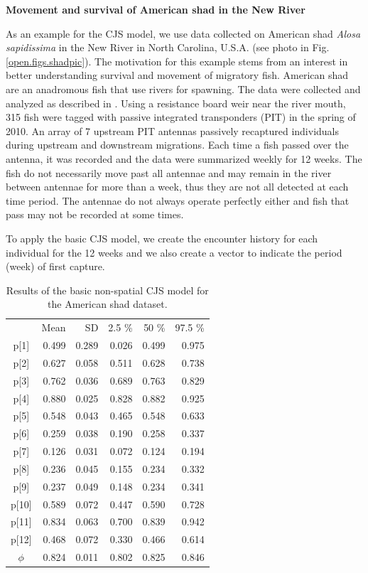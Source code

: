 {\flushleft \bf Movement and survival of American shad in the New River}

As an example for the CJS model, we use data collected on
American shad \textit{Alosa sapidissima} in the New River in North
Carolina, U.S.A. (see photo in Fig. \ref{open.figs.shadpic}). 
The motivation for this example stems
from an interest in better understanding survival and movement of
migratory fish.  American shad are an anadromous fish that use rivers for
spawning.
 The
data were collected and analyzed as described in \citet{raabe_diss:2012}.  Using a
resistance board weir near the river mouth, 315 fish were tagged with
passive integrated transponders (PIT) in the spring of 2010. An array
of 7 upstream PIT antennas passively recaptured individuals during
upstream and downstream migrations.  Each time a fish passed over the
antenna, it was recorded and the data were summarized weekly for 12 weeks. 
The fish
do not necessarily move past all antennae and may remain in the river
between antennae for more than a week, thus they are not all detected
at each time period.  The antennae do not always operate perfectly
either and fish that pass may not be recorded at some times.

To apply the basic CJS model, we create the
encounter history for each individual for the 12 weeks and we also create
a vector to indicate the period (week) of first capture.

\begin{table}
\centering
\caption{Results of the basic non-spatial CJS model for the American shad dataset.
}
\begin{tabular}{crrrrr}
\hline \hline
&    Mean   &  SD  &  2.5 \%   &   50 \%    &  97.5 \% \\
p[1] & 0.499 & 0.289 & 0.026 & 0.499 & 0.975 \\
p[2] & 0.627 & 0.058 & 0.511 & 0.628 & 0.738 \\
p[3] & 0.762 & 0.036 & 0.689 & 0.763 & 0.829 \\
p[4] & 0.880 & 0.025 & 0.828 & 0.882 & 0.925 \\
p[5] & 0.548 & 0.043 & 0.465 & 0.548 & 0.633 \\
p[6] & 0.259 & 0.038 & 0.190 & 0.258 & 0.337 \\
p[7] & 0.126 & 0.031 & 0.072 & 0.124 & 0.194 \\
p[8] & 0.236 & 0.045 & 0.155 & 0.234 & 0.332 \\
p[9] & 0.237 & 0.049 & 0.148 & 0.234 & 0.341 \\
p[10]& 0.589 & 0.072 & 0.447 & 0.590 & 0.728  \\
p[11]& 0.834 & 0.063 & 0.700 & 0.839 & 0.942 \\
p[12]& 0.468 & 0.072 & 0.330 & 0.466 & 0.614 \\
$\phi$  & 0.824 & 0.011 & 0.802 & 0.825 & 0.846 \\
\hline
\end{tabular}
\label{open.tab.simple-shad}
\end{table}


